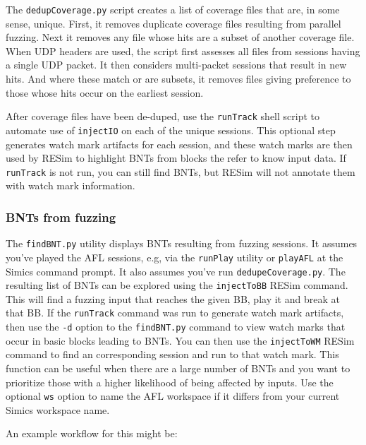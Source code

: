 \documentclass[titlepage]{article}
\begin{document}
The {\tt dedupCoverage.py} script creates a list of coverage files that are, in some sense, unique.  First, it removes duplicate coverage files resulting from
parallel fuzzing.  Next it removes any file whose hits are a subset of another coverage file.  When UDP headers are used, the script first assesses all files from
sessions having a single UDP packet.  It then considers multi-packet sessions that result in new hits.  And where these match or are subsets, it removes files 
giving preference to those whose hits occur on the earliest session.

After coverage files have been de-duped, use the {\tt runTrack} shell script to automate use of {\tt injectIO} on each of the unique sessions.  This optional step
generates watch mark artifacts for each session, and these watch marks are then used by RESim to highlight BNTs from blocks the refer to know input data.  If {\tt runTrack}
is not run, you can still find BNTs, but RESim will not annotate them with watch mark information.

\subsubsection{BNTs from fuzzing}
\label{BNT-fuzz}
The {\tt findBNT.py} utility displays BNTs resulting from fuzzing sessions.  It assumes you've played the AFL sessions, e.g, via the {\tt runPlay} utility or {\tt playAFL}
at the Simics command prompt.  It also assumes you've run {\tt dedupeCoverage.py}.  The resulting list of BNTs can be explored using the {\tt injectToBB}
RESim command.  This will find a fuzzing input that reaches the given BB, play it and break at that BB.  If the {\tt runTrack} command was run to generate watch mark
artifacts, then use the {\tt -d} option to the {\tt findBNT.py} command to view watch marks that occur in basic blocks leading to BNTs.  You can then use the
{\tt injectToWM} RESim command to find an corresponding session and run to that watch mark.  This function can be useful when there are a large number
of BNTs and you want to prioritize those with a higher likelihood of being affected by inputs. Use the optional {\tt ws} option to name the AFL workspace if it differs
from your current Simics workspace name. 

An example workflow for this might be:
\end{document}
